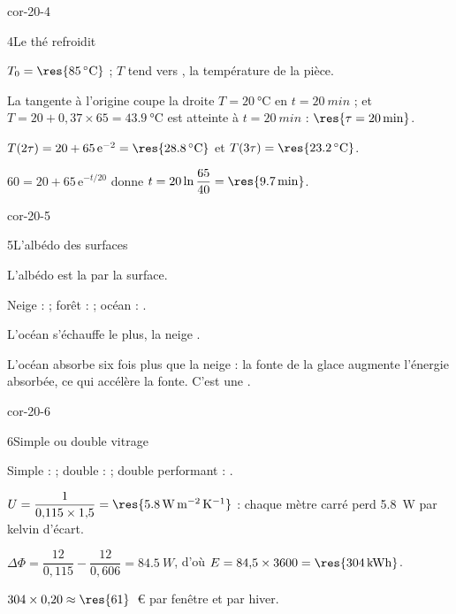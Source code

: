 \begin{blocLivre}{cor-20-4}
\begin{corrige}{4}{Le thé refroidit}
\begin{questions}
\item $T_0=\res{\qty{85}{\degreeCelsius}}$ ; $T$ tend vers , la température de la pièce.
\item La tangente à l'origine coupe la droite $T=\qty{20}{\degreeCelsius}$ en $t=\qty{20}{min}$ ; et $T=20+0{,}37\times65=\qty{43,9}{\degreeCelsius}$
est atteinte à $t=\qty{20}{min}$ : $\res{\tau=\qty{20}{min}}$.
\item $T(2\tau)=20+65\,\mathrm{e}^{-2}=\res{\qty{28,8}{\degreeCelsius}}$ et $T(3\tau)=\res{\qty{23,2}{\degreeCelsius}}$.
\item $60=20+65\,\mathrm{e}^{-t/20}$ donne $t=20\ln\dfrac{65}{40}=\res{\qty{9,7}{min}}$.
\end{questions}
\end{corrige}
\end{blocLivre}
\begin{blocLivre}{cor-20-5}
\begin{corrige}{5}{L'albédo des surfaces}
\begin{questions}
\item L'albédo est la  par la surface.
\item Neige :  ; forêt :  ; océan : .
\item L'océan s'échauffe le plus, la neige .
\item L'océan absorbe six fois plus que la neige : la fonte de la glace augmente l'énergie absorbée, ce qui accélère la
fonte. C'est une .
\end{questions}
\end{corrige}
\end{blocLivre}
\begin{blocLivre}{cor-20-6}
\begin{corrige}{6}{Simple ou double vitrage}
\begin{questions}
\item Simple :  ; double :  ; double performant : .
\item $U=\dfrac{1}{0{,}115\times1{,}5}=\res{\qty{5,8}{W.m^{-2}.K^{-1}}}$ : chaque mètre carré perd \qty{5,8}{W} par kelvin d'écart.
\item $\Delta\Phi=\dfrac{12}{0{,}115}-\dfrac{12}{0{,}606}=\qty{84,5}{W}$, d'où $E=84{,}5\times3600=\res{\qty{304}{kWh}}$.
\item $304\times0{,}20\approx\res{61}$~€ par fenêtre et par hiver.
\end{questions}
\end{corrige}
\end{blocLivre}
